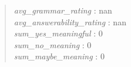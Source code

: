 \begin{quote}
\emph{avg\_grammar\_rating} : nan\\
\emph{avg\_answerability\_rating} : nan\\
\emph{sum\_yes\_meaningful} : 0\\
\emph{sum\_no\_meaning} : 0\\
\emph{sum\_maybe\_meaning} : 0
\end{quote}
